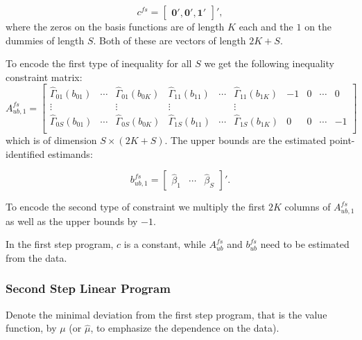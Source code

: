 \documentclass[12pt,a4paper,english]{article} %
\numberwithin{equation}{section}
\theoremstyle{definition}
\theoremstyle{remark}
\theoremstyle{plain}
\begin{document}
\begin{equation*}
  c^{fs} =
  \begin{bmatrix}
     \mathbf{0}', \mathbf{0}', \mathbf{1}'
  \end{bmatrix}',
\end{equation*}
where the zeros on the basis functions are of length $K$ each and the $1$ on the dummies of length $S$.
Both of these are vectors of length $2K + S$.


To encode the first type of inequality for all $S$ we get the following inequality constraint matrix:
\begin{equation*}
  A_{ub, 1}^{fs} =
  \begin{bmatrix}
    \hat{\Gamma}_{01}(b_{01}) & \cdots & \hat{\Gamma}_{01}(b_{0K}) & \hat{\Gamma}_{11}(b_{11}) & \cdots & \hat{\Gamma}_{11}(b_{1K}) & -1 & 0 & \cdots & 0 \\
    \vdots & & \vdots & \vdots &  & \vdots & \\
    \hat{\Gamma}_{0S}(b_{01}) & \cdots & \hat{\Gamma}_{0S}(b_{0K}) & \hat{\Gamma}_{1S}(b_{11}) & \cdots & \hat{\Gamma}_{1S}(b_{1K}) & 0 & 0 & \cdots & -1 \\
  \end{bmatrix}
\end{equation*}
which is of dimension $S\times (2K + S)$. The upper bounds are the estimated point-identified estimands:

\begin{equation*}
  b_{ub, 1}^{fs} =
  \begin{bmatrix}
    \hat{\beta}_1 & \cdots & \hat{\beta}_S
  \end{bmatrix}'.
\end{equation*}

To encode the second type of constraint we multiply the first $2K$ columns of $A_{ub, 1}^{fs}$ as well as the upper bounds by $-1$.

In the first step program, $c$ is a constant, while $A_{ub}^{fs}$ and $b_{ub}^{fs}$ need to be estimated from the data.

\subsubsection{Second Step Linear Program}
Denote the minimal deviation from the first step program, that is the value function, by $\mu$ (or $\hat{\mu}$, to emphasize the dependence on the data).
\end{document}
